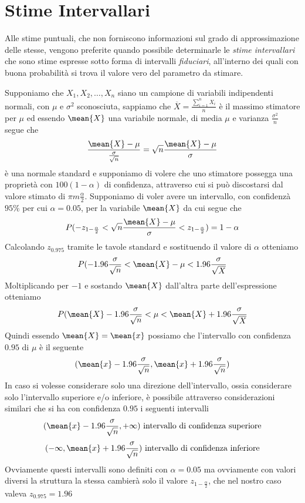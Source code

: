 \documentclass[a4paper,12pt, oneside]{book}
\begin{document}
\section{Stime Intervallari}
Alle stime puntuali, che non forniscono informazioni sul grado di approssimazione delle stesse, vengono preferite quando possibile
determinarle le \emph{stime intervallari} che sono stime espresse sotto forma di intervalli \emph{fiduciari}, 
all’interno dei quali con buona probabilità si trova il valore vero del parametro da stimare.\newline

Supponiamo che $X_1, X_2, \dots, X_n$ siano un campione di variabili indipendenti normali, con $\mu$ e $\sigma^2$
sconosciuta, sappiamo che $\overline{X} = \frac{\sum _{i = 1}^n X_i}{n}$ è il massimo stimatore per $\mu$ ed essendo
$\mean{X}$ una variabile normale, di media $\mu$ e varianza $\frac{\sigma^2}{n}$ segue che
\[ \frac{\mean{X} - \mu}{\frac{\sigma}{\sqrt{n}}} = \sqrt{n} \frac{\mean{X} - \mu}{\sigma} \]
è una normale standard  e supponiamo di volere che uno stimatore possegga una proprietà con $100(1 - \alpha)$ di
confidenza, attraverso cui si può discostarsi dal valore stimato di $\pi m \frac{\alpha}{2}$.\newline
Supponiamo di voler avere un intervallo, con confidenzà $95\%$ per cui $\alpha = 0.05$, per la variabile $\mean{X}$ 
da cui segue che
\[ P(-z_{1 - \frac{\alpha}{2}} < \sqrt{n} \frac{\mean{X} - \mu}{\sigma} < z_{1 - \frac{\alpha}{2}}) = 1 - \alpha \]
Calcolando $z_{0.975}$ tramite le tavole standard e sostituendo il valore di $\alpha$ otteniamo
\[ P(-1.96 \frac{\sigma}{\sqrt{n}} < \mean{X} - \mu < 1.96 \frac{\sigma}{\sqrt{X}} \]
Moltiplicando per $-1$ e sostando $\mean{X}$ dall'altra parte dell'espressione otteniamo
\[ P(\mean{X} - 1.96 \frac{\sigma}{\sqrt{n}} < \mu < \mean{X} + 1.96 \frac{\sigma}{\sqrt{X}} \]
Quindi essendo $\mean{X} = \mean{x}$ possiamo che l'intervallo con confidenza $0.95$ di $\mu$ è il seguente
\[ (\mean{x} - 1.96 \frac{\sigma}{\sqrt{n}}, \mean{x} + 1.96 \frac{\sigma}{\sqrt{n}}) \]
In caso si volesse considerare solo una direzione dell'intervallo, ossia considerare solo l'intervallo superiore e/o
inferiore, è possibile attraverso considerazioni similari che si ha con confidenza $0.95$ i seguenti intervalli
\[ (\mean{x} - 1.96 \frac{\sigma}{\sqrt{n}}, +\infty) \mbox { intervallo di confidenza superiore} \]
\[ (-\infty, \mean{x} + 1.96 \frac{\sigma}{\sqrt{n}}) \mbox { intervallo di confidenza inferiore} \]
Ovviamente questi intervalli sono definiti con $\alpha = 0.05$ ma ovviamente con valori diversi la struttura la stessa 
cambierà solo il valore $z_{1 - \frac{\alpha}{2}}$, che nel nostro caso valeva $z_{0.975} = 1.96$
\end{document}
